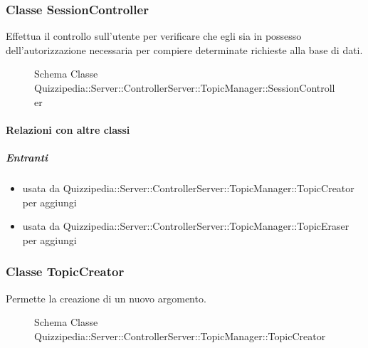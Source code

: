 \subsubsection{Classe SessionController}
Effettua il controllo sull'utente per verificare che egli sia in possesso dell'autorizzazione necessaria per compiere determinate richieste alla base di dati.
\begin{figure}[H]
\centering
\noindent{}
\caption[Schema Classe SessionController]{Schema Classe Quizzipedia::Server::ControllerServer::TopicManager::SessionController}
\end{figure}
\paragraph{Relazioni con altre classi}
\subparagraph{Entranti}
\begin{itemize}
\item usata da Quizzipedia::Server::ControllerServer::TopicManager::TopicCreator per aggiungi
\item usata da Quizzipedia::Server::ControllerServer::TopicManager::TopicEraser per aggiungi
\end{itemize}
\subsubsection{Classe TopicCreator}
Permette la creazione di un nuovo argomento.
\begin{figure}[H]
\centering
\noindent{}
\caption[Schema Classe TopicCreator]{Schema Classe Quizzipedia::Server::ControllerServer::TopicManager::TopicCreator}
\end{figure}
